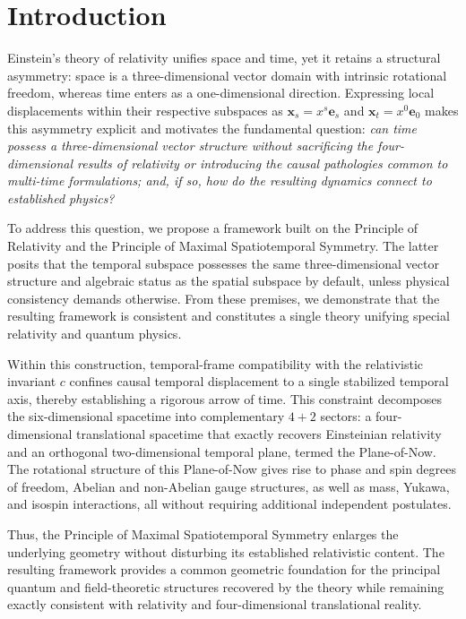 
\section{Introduction}
\label{ch_intro}
Einstein's theory of relativity unifies space and time, yet it retains a structural asymmetry: space is a three-dimensional vector domain with intrinsic rotational freedom, whereas time enters as a one-dimensional direction. Expressing local displacements within their respective subspaces as $\mathbf{x}_{s}=x^{s}\mathbf{e}_{s}$ and $\mathbf{x}_{t}=x^{0}\mathbf{e}_{0}$ makes this asymmetry explicit and motivates the fundamental question: \emph{can time possess a three-dimensional vector structure without sacrificing the four-dimensional results of relativity or introducing the causal pathologies common to multi-time formulations; and, if so, how do the resulting dynamics connect to established physics?}

To address this question, we propose a framework built on the Principle of Relativity and the Principle of Maximal Spatiotemporal Symmetry. The latter posits that the temporal subspace possesses the same three-dimensional vector structure and algebraic status as the spatial subspace by default, unless physical consistency demands otherwise. From these premises, we demonstrate that the resulting framework is consistent and constitutes a single theory unifying special relativity and quantum physics.

Within this construction, temporal-frame compatibility with the relativistic invariant $c$ confines causal temporal displacement to a single stabilized temporal axis, thereby establishing a rigorous arrow of time. This constraint decomposes the six-dimensional spacetime into complementary $4+2$ sectors: a four-dimensional translational spacetime that exactly recovers Einsteinian relativity and an orthogonal two-dimensional temporal plane, termed the Plane-of-Now. The rotational structure of this Plane-of-Now gives rise to phase and spin degrees of freedom, Abelian and non-Abelian gauge structures, as well as mass, Yukawa, and isospin interactions, all without requiring additional independent postulates.

Thus, the Principle of Maximal Spatiotemporal Symmetry enlarges the underlying geometry without disturbing its established relativistic content. The resulting framework provides a common geometric foundation for the principal quantum and field-theoretic structures recovered by the theory while remaining exactly consistent with relativity and four-dimensional translational reality.

